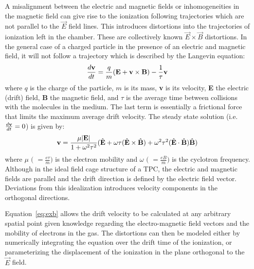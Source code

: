 \documentclass{article}
\begin{document}
A misalignment between the electric and magnetic fields
or inhomogeneities in the magnetic field can
give rise to the ionization following trajectories which are not 
parallel to the $\vec{E}$ field lines.  This introduces distortions
into the trajectories of ionization left in the chamber.  These are
collectively known $\vec{E} \times \vec{B}$ distortions.
In the general case of a charged particle in the presence of an 
electric and magnetic field, it will not follow a trajectory
which is described by the Langevin equation:
\begin{equation}
\frac{d{\bf v}}{dt} = \frac{q}{m}({\bf E} + {\bf v} \times {\bf B}) - \frac{1}{\tau} {\bf v}
\label{eq:lang}
\end{equation}
where $q$ is the charge of the particle, $m$ is its mass, {\bf v} is 
its velocity, {\bf E} the electric (drift) field, {\bf B} the 
magnetic field, and $\tau$ is the average time between collisions 
with the molecules in the medium.  The last term is essentially 
a frictional force that limits the maximum average drift velocity.  
The steady state solution (i.e.~$\frac{d{\bf v}}{dt} = 0$) is given by:
\begin{equation}
{\bf v} = \frac{\mu |{\bf E}| }{1 + \omega ^{2} \tau ^{2}} ( \hat{\bf E} + \omega  \tau   (\hat{\bf E} \times \hat{\bf B})  + \omega ^{2} \tau ^{2}(\hat{\bf E} \cdot \hat{\bf B} )\hat{\bf B})
\label{eq:exb}
\end{equation}
where $\mu$ $($ $= \frac{e \tau}{m})$ is the electron mobility 
and $\omega$ $($ $= \frac{e B}{m})$ is the cyclotron frequency.  
Although in the ideal field cage structure of a TPC, the electric and
magnetic fields are parallel and the drift direction is defined
by the electric field vector.  Deviations from this idealization
introduces velocity components in the orthogonal directions.

Equation~\ref{eq:exb} allows the drift velocity to be calculated at any
arbitrary spatial point given knowledge regarding the electro-magnetic
field vectors and the mobility of electrons in the gas.
The distortions can then be modeled either by numerically
integrating the equation over the drift time of the ionization, or
parameterizing the displacement of the ionization in the plane
orthogonal to the $\vec{E}$ field.
\end{document}
